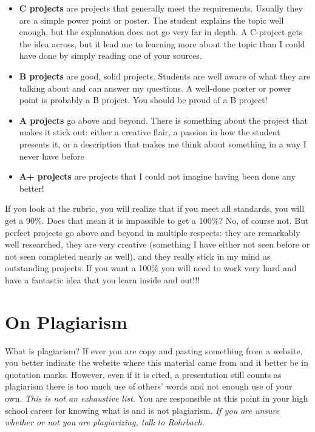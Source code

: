 \documentclass[11pt]{exam}
\begin{document}
  \begin{itemize}
    \item {\bf C projects} are projects that generally meet the requirements.  Usually they are a simple power point or poster.  The student explains the topic well enough, but the explanation does not go very far in depth.  A C-project gets the idea across, but it lead me to learning more about the topic than I could have done by simply reading one of your sources.
    \item {\bf B projects} are good, solid projects.  Students are well aware of what they are talking about and can answer my questions.  A well-done poster or power point is probably a B project.  You should be proud of a B project!
    \item {\bf A projects} go above and beyond.  There is something about the project that makes it stick out: either a creative flair, a passion in how the student presents it, or a description that makes me think about something in a way I never have before
    \item {\bf A+ projects} are projects that I could not imagine having been done any better!
  \end{itemize}

If you look at the rubric, you will realize that if you meet all standards, you will get a 90\%.  Does that mean it is impossible to get a 100\%?  No, of course not.  But perfect projects go above and beyond in multiple respects: they are remarkably well researched, they are very creative (something I have either not seen before or not seen completed nearly as well), and they really stick in my mind as outstanding projects.  If you want a 100\% you will need to work very hard and have a fantastic idea that you learn inside and out!!!

\section*{On Plagiarism}
What is plagiarism? If ever you are copy and pasting something from a website, you better indicate the website where this material came from and it better be in quotation marks. However, even if it is cited, a presentation still counts as plagiarism there is too much use of others' words and not enough use of your own. \emph{This is not an exhaustive list.} You are responsible at this point in your high school career for knowing what is and is not plagiarism. \emph{If you are unsure whether or not you are plagiarizing, talk to Rohrbach.}
\end{document}
